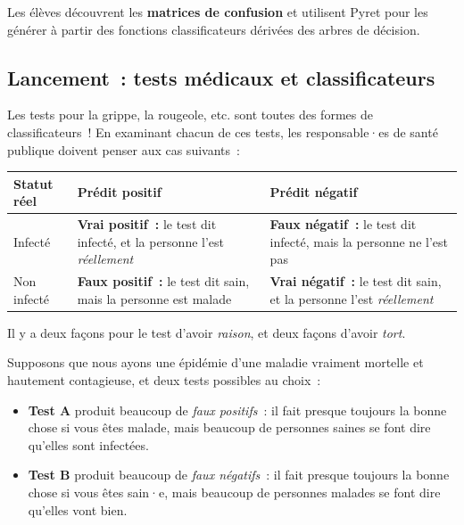 \documentclass[12pt,a4paper]{article}
\begin{document}
\begin{overviewbox}
  Les élèves découvrent les \textbf{matrices de confusion} et utilisent Pyret pour les générer à partir des fonctions classificateurs dérivées des arbres de décision.
\end{overviewbox}

\subsection{Lancement~: tests médicaux et classificateurs}

Les tests pour la grippe, la rougeole, etc. sont toutes des formes de classificateurs~! En examinant chacun de ces tests, les responsable·es de santé publique doivent penser aux cas suivants~:

\begin{center}
\begin{tabularx}{\textwidth}{l X X}
  \toprule
  \textbf{Statut réel} & \textbf{Prédit positif} & \textbf{Prédit négatif} \\
  \midrule
  Infecté       & \cellcolor{tp!15}\textcolor{tp}{\textbf{Vrai positif~:}} le test dit infecté, et la personne l'est \emph{réellement}
                & \cellcolor{fn!15}\textcolor{fn}{\textbf{Faux négatif~:}} le test dit infecté, mais la personne ne l'est pas \\[0.4em]
  Non infecté   & \cellcolor{fp!15}\textcolor{fp}{\textbf{Faux positif~:}} le test dit sain, mais la personne est malade
                & \cellcolor{tn!15}\textcolor{tn}{\textbf{Vrai négatif~:}} le test dit sain, et la personne l'est \emph{réellement} \\
  \bottomrule
\end{tabularx}
\end{center}

\begin{keypointbox}
  Il y a deux façons pour le test d'avoir \emph{raison}, et deux façons d'avoir \emph{tort}.

  Supposons que nous ayons une épidémie d'une maladie vraiment mortelle et hautement contagieuse, et deux tests possibles au choix~:
  \begin{itemize}
    \item \textbf{Test A} produit beaucoup de \emph{faux positifs}~: il fait presque toujours la bonne chose si vous êtes malade, mais beaucoup de personnes saines se font dire qu'elles sont infectées.
    \item \textbf{Test B} produit beaucoup de \emph{faux négatifs}~: il fait presque toujours la bonne chose si vous êtes sain·e, mais beaucoup de personnes malades se font dire qu'elles vont bien.
  \end{itemize}
\end{keypointbox}
\end{document}
